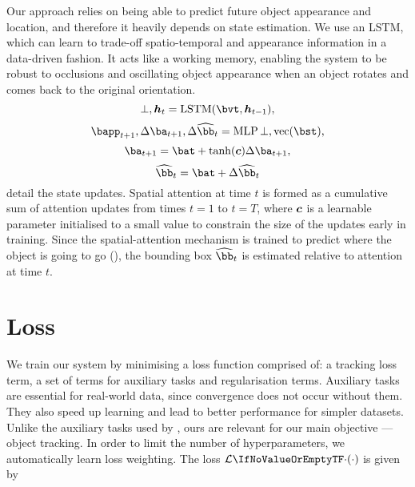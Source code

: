 \begin{description}[leftmargin=\parindent]
    Our approach relies on being able to predict future object appearance and location, and therefore it heavily depends on state estimation. We use an LSTM, which can learn to trade-off spatio-temporal and appearance information in a data-driven fashion. It acts like a working memory, enabling the system to be robust to occlusions and oscillating object appearance \eg when an object rotates and comes back to the original orientation.
    \begin{equation} 
        \label{eq:state}
    	\bot, \B{h}_t = \LSTM{ \bvt, \B{h}_{t-1} },
    \end{equation}
    \begin{equation} 
	    \label{eq:mlp}
	    \bapp_{t+1}, \Delta \ba_{t+1}, \Delta \widehat{\bb}_t = \MLP{ \bot, \flatten{\bst} },
    \end{equation}
    \begin{equation}
        \label{eq:att_update}
     	\ba_{t+1} = \bat + \tanh(\B{c}) \Delta \ba_{t+1},
    \end{equation}
    \begin{equation}
        \label{eq:bbox_update}
     	\widehat{\bb}_t = \bat + \Delta \widehat{\bb}_t
    \end{equation}
     detail the state updates. Spatial attention at time $t$ is formed as a cumulative sum of attention updates from times $t=1$ to $t=T$, where $\B{c}$ is a learnable parameter initialised to a small value to constrain the size of the updates early in training. Since the spatial-attention mechanism is trained to predict where the object is going to go (), the bounding box $\widehat{\bb}_t$ is estimated relative to attention at time $t$. 
   
   \end{description}
   
   \section{Loss}
   \label{sec:loss}
   	
   We train our system by minimising a loss function comprised of: a tracking loss term, a set of terms for auxiliary tasks and regularisation terms. Auxiliary tasks are essential for real-world data, since convergence does not occur without them. They also speed up learning and lead to better performance for simpler datasets. Unlike the auxiliary tasks used by \citet{Jaderberg2016}, ours are relevant for our main objective --- object tracking. In order to limit the number of hyperparameters, we automatically learn loss weighting. The loss $\loss{\cdot}$ is given by
   
